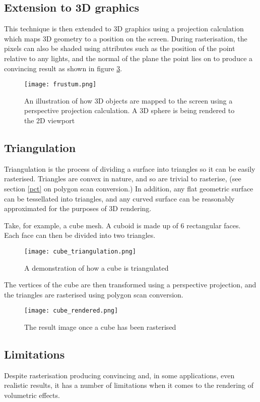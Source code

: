 \subsection{Extension to 3D graphics}
This technique is then extended to 3D graphics using a projection calculation which maps 3D geometry to a position on the screen. During rasterisation, the pixels can also be shaded using attributes such as the position of the point relative to any lights, and the normal of the plane the point lies on to produce a convincing result as shown in figure \ref{fig:cube_render}.

\begin{figure}
\centering
	\texttt{[image: frustum.png]}
	\caption{An illustration of how 3D objects are mapped to the screen using a perspective projection calculation. A 3D sphere is being rendered to the 2D viewport}
	\label{fig:perspective_calculation}
\end{figure}

\subsection{Triangulation}
Triangulation is the process of dividing a surface into triangles so it can be easily rasterised. Triangles are convex in nature, and so are trivial to rasterise, (see section \ref{pct} on polygon scan conversion.) In addition, any flat geometric surface can be tessellated into triangles, and any curved surface can be reasonably approximated for the purposes of 3D rendering.

Take, for example, a cube mesh. A cuboid is made up of 6 rectangular faces. Each face can then be divided into two triangles.

\begin{figure}
\centering
	\texttt{[image: cube\_triangulation.png]}
	\caption{A demonstration of how a cube is triangulated}
	\label{fig:cube_triangulation}
\end{figure}

The vertices of the cube are then transformed using a perspective projection, and the triangles are rasterised using polygon scan conversion.

\begin{figure}
\centering
	\texttt{[image: cube\_rendered.png]}
	\caption{The result image once a cube has been rasterised}
	\label{fig:cube_render}
\end{figure}

\subsection{Limitations}
Despite rasterisation producing convincing and, in some applications, even realistic results, it has a number of limitations when it comes to the rendering of volumetric effects.

